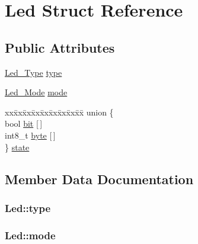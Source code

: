 \hypertarget{structLed}{
\section{Led Struct Reference}
\label{structLed}
}
\subsection*{Public Attributes}
\begin{CompactItemize}
\item 
\hyperlink{Led_8h_c29801b77d80bd653cb30ab61baa55ab}{Led\_\-Type} \hyperlink{structLed_a6cdae5060271f1cb1c35dbebbb46161}{type}
\item 
\hyperlink{Led_8h_d9e496f8985becbce5b82905f94fa699}{Led\_\-Mode} \hyperlink{structLed_cac979ea66cf5829167afb501b402de3}{mode}
\item 
\begin{tabbing}
xx\=xx\=xx\=xx\=xx\=xx\=xx\=xx\=xx\=\kill
union \{\\
\>bool \hyperlink{structLed_d13200d974e7d589b1e2428e5a47fd9f}{bit} \mbox{[}$\,$\mbox{]}\\
\>int8\_t \hyperlink{structLed_2da7b4719c7df53cfca3e799385f0ab4}{byte} \mbox{[}$\,$\mbox{]}\\
\} \hyperlink{structLed_1691c11d2cb03a7b4cbd5f094f68205c}{state}\\

\end{tabbing}\end{CompactItemize}


\subsection{Member Data Documentation}
\hypertarget{structLed_a6cdae5060271f1cb1c35dbebbb46161}{
\subsubsection{ {\bf Led::type}}}
\label{structLed_a6cdae5060271f1cb1c35dbebbb46161}


\hypertarget{structLed_cac979ea66cf5829167afb501b402de3}{
\subsubsection{ {\bf Led::mode}}}
\label{structLed_cac979ea66cf5829167afb501b402de3}


